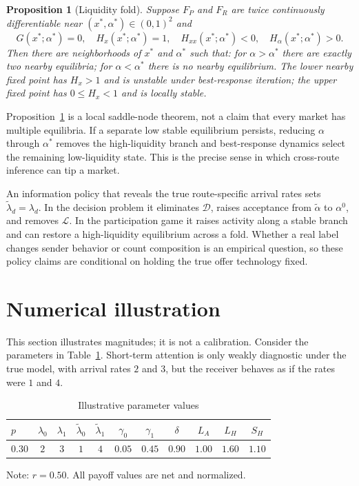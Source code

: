 \documentclass[11pt]{article}
\newtheorem{proposition}{Proposition}
\begin{document}
\begin{proposition}[Liquidity fold]\label{prop:fold}
Suppose $F_P$ and $F_R$ are twice continuously differentiable near
$(x^*,\alpha^*)\in(0,1)^2$ and
\begin{equation}
G(x^*;\alpha^*)=0,\quad
H_x(x^*;\alpha^*)=1,\quad
H_{xx}(x^*;\alpha^*)<0,\quad
H_\alpha(x^*;\alpha^*)>0. \label{eq:fold-conditions}
\end{equation}
Then there are neighborhoods of $x^*$ and $\alpha^*$ such that: for
$\alpha>\alpha^*$ there are exactly two nearby equilibria; for
$\alpha<\alpha^*$ there is no nearby equilibrium. The lower nearby fixed point
has $H_x>1$ and is unstable under best-response iteration; the upper fixed
point has $0\leq H_x<1$ and is locally stable.
\end{proposition}

Proposition~\ref{prop:fold} is a local saddle-node theorem, not a claim that
every market has multiple equilibria. If a separate low stable equilibrium
persists, reducing $\alpha$ through $\alpha^*$ removes the high-liquidity branch
and best-response dynamics select the remaining low-liquidity state. This is
the precise sense in which cross-route inference can tip a market.

An information policy that reveals the true route-specific arrival rates sets
$\widetilde\lambda_d=\lambda_d$. In the decision problem it eliminates
$\mathcal D$, raises acceptance from $\widetilde\alpha$ to $\alpha^0$, and
removes $\mathcal L$. In the participation game it raises activity along a
stable branch and can restore a high-liquidity equilibrium across a fold.
Whether a real label changes sender behavior or count composition is an
empirical question, so these policy claims are conditional on holding the true
offer technology fixed.

\section{Numerical illustration}

This section illustrates magnitudes; it is not a calibration. Consider the
parameters in Table~\ref{tab:parameters}. Short-term attention is only weakly
diagnostic under the true model, with arrival rates $2$ and $3$, but the
receiver behaves as if the rates were $1$ and $4$.

\begin{table}[ht]
\centering
\caption{Illustrative parameter values}
\label{tab:parameters}
\begin{tabular}{lcccccccccc}
\toprule
$p$ & $\lambda_0$ & $\lambda_1$ & $\widetilde\lambda_0$
& $\widetilde\lambda_1$ & $\gamma_0$ & $\gamma_1$ & $\delta$
& $L_A$ & $L_H$ & $S_H$ \\
\midrule
$0.30$ & $2$ & $3$ & $1$ & $4$ & $0.05$ & $0.45$ & $0.90$
& $1.00$ & $1.60$ & $1.10$ \\
\bottomrule
\end{tabular}
\begin{minipage}{0.92\textwidth}
\footnotesize\vspace{0.4em}
Note: $r=0.50$. All payoff values are net and normalized.
\end{minipage}
\end{table}
\end{document}
